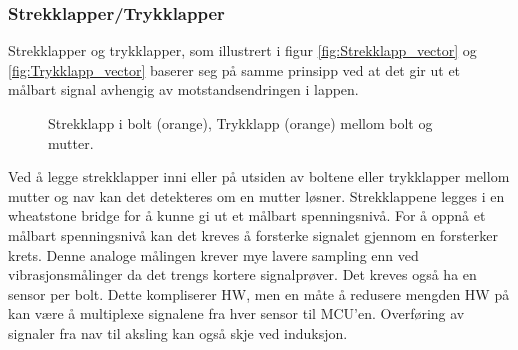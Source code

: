 \subsubsection{Strekklapper/Trykklapper}

Strekklapper og trykklapper, som illustrert i figur \ref{fig:Strekklapp_vector} og \ref{fig:Trykklapp_vector} baserer seg på samme prinsipp ved at det gir ut et målbart signal avhengig av
motstandsendringen i lappen. 
\begin{figure}[H] \centering
{}
\hspace{3cm}
\caption{\protect{\ref{fig:Strekklapp_vector}} Strekklapp i bolt (orange), \protect{\ref{fig:Trykklapp_vector}} Trykklapp (orange) mellom bolt og mutter.}
\end{figure}
Ved å legge strekklapper inni eller på utsiden av boltene eller
trykklapper mellom mutter og nav kan det detekteres om en mutter løsner. Strekklappene
legges i en wheatstone bridge \cite{wheatstone} for å kunne gi ut et målbart
spenningsnivå. For å oppnå et målbart spenningsnivå kan det kreves å
forsterke signalet gjennom en forsterker krets. Denne analoge målingen krever mye lavere sampling enn ved
vibrasjonsmålinger da det trengs kortere signalprøver.
Det kreves også ha en sensor per bolt. Dette kompliserer HW, men en måte å redusere
mengden HW på kan være å multiplexe signalene fra hver sensor til MCU'en. 
Overføring av signaler fra nav til aksling kan også skje ved induksjon. 

